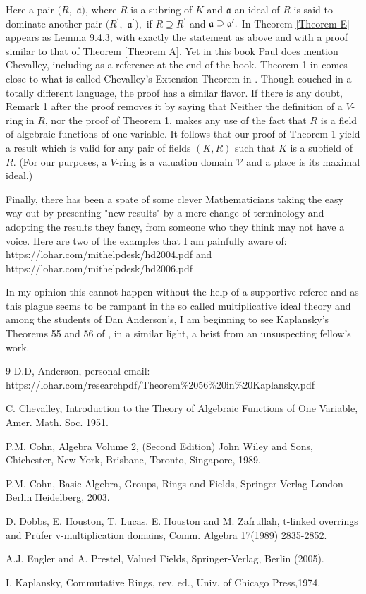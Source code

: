 \documentclass{amsproc}
\theoremstyle{plain}
\numberwithin{equation}{section}
\begin{document}
Here a pair $(R,$ $\mathfrak{a})$, where $R$ is a subring of $K$ and $%
\mathfrak{a}$ an ideal of $R$ is said to dominate another pair $(R^{\prime
}, $ $\mathfrak{a}^{\prime }),$ if $R\supseteq R^{\prime }$ and $\mathfrak{%
a\supseteq a}^{\prime }.$ In \cite{C BA} Theorem \ref{Theorem E} appears as
Lemma 9.4.3, with exactly the statement as above and with a proof similar to
that of Theorem \ref{Theorem A}. Yet in this book Paul does mention
Chevalley, including \cite{Chev} as a reference at the end of the book.
Theorem 1 in \cite{Chev} comes close to what is called Chevalley's Extension
Theorem in \cite{EP}. Though couched in a totally different language, the
proof has a similar flavor. If there is any doubt, Remark 1 after the proof
removes it by saying that Neither the definition of a $V$-ring in $R$, nor
the proof of Theorem 1, makes any use of the fact that $R$ is a field of
algebraic functions of one variable. It follows that our proof of Theorem 1
yield a result which is valid for any pair of fields $(K,R)$ such that $K$
is a subfield of $R.$ (For our purposes, a $V$-ring is a valuation domain $%
\mathcal{V}$ and a place is its maximal ideal.)

Finally, there has been a spate of some clever Mathematicians taking the
easy way out by presenting "new results" by a mere change of terminology and
adopting the results they fancy, from someone who they think may not have a
voice. Here are two of the examples that I am painfully aware of:
https://lohar.com/mithelpdesk/hd2004.pdf and
https://lohar.com/mithelpdesk/hd2006.pdf

In my opinion this cannot happen without the help of a supportive referee
and as this plague seems to be rampant in the so called multiplicative ideal
theory and among the students of Dan Anderson's, I am beginning to see
Kaplansky's Theorems 55 and 56 of \cite{K}, in a similar light, a heist from
an unsuspecting fellow's work. 

\bigskip

\begin{thebibliography}{9}
 D.D, Anderson, personal email:
https://lohar.com/researchpdf/Theorem\%2056\%20in\%20Kaplansky.pdf

 C. Chevalley, Introduction to the Theory of Algebraic
Functions of One Variable, Amer. Math. Soc. 1951.

 P.M. Cohn, Algebra Volume 2, (Second Edition) John Wiley and
Sons, Chichester, New York, Brisbane, Toronto, Singapore, 1989.\newline

 P.M. Cohn, Basic Algebra, Groups, Rings and Fields,
Springer-Verlag London Berlin Heidelberg, 2003.

 D. Dobbs, E. Houston, T. Lucas. E. Houston and M. Zafrullah,
t-linked overrings and Pr\"{u}fer v-multiplication domains, Comm. Algebra
17(1989) 2835-2852.

 A.J. Engler and A. Prestel, Valued Fields, Springer-Verlag,
Berlin (2005).

 I. Kaplansky, Commutative Rings, rev. ed., Univ. of Chicago
Press,1974.
\end{thebibliography}

\bigskip
\end{document}
